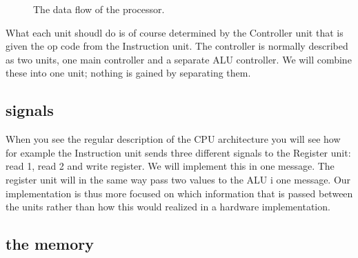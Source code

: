 \documentclass[a4paper,11pt]{article}
\begin{document}
\begin{figure}
  \centering 
  \caption{The data flow of the processor.} \label{fig:flow}
\end{figure}

What each unit shoudl do is of course determined by the Controller
unit that is given the op code from the Instruction unit. The controller is
normally described as two units, one main controller and a separate
ALU controller. We will combine these into one unit; nothing is gained
by separating them.


\subsection{signals}

When you see the regular description of the CPU architecture you will
see how for example the Instruction unit sends three different signals to
the Register unit: read 1, read 2 and write register. We will
implement this in one message. The register unit will in the same way
pass two values to the ALU i one message.  Our implementation is thus
more focused on which information that is passed between the units
rather than how this would realized in a hardware implementation.

\subsection{the memory}
\end{document}
